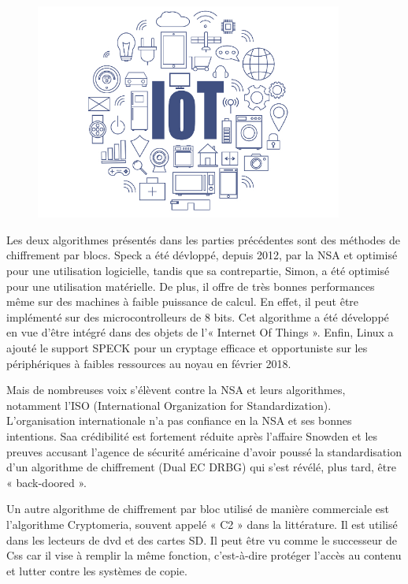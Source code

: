 	\begin{figure}[!h]
		\centering
		\includegraphics[width=0.9\textwidth]{imgs/application/IOT.jpg}
		\label{IOT}
	\end{figure}

	Les deux algorithmes présentés dans les parties précédentes sont des méthodes
	de chiffrement par blocs. Speck a été dévloppé, depuis 2012, par la NSA et
	optimisé pour une utilisation logicielle, tandis que sa contrepartie, Simon, a
	été optimisé pour une utilisation matérielle. De plus, il offre de très bonnes
	performances même sur des machines à faible puissance de calcul. En effet, il
	peut être implémenté sur des microcontrolleurs de 8 bits. Cet algorithme a été
	développé en vue d'être intégré dans des objets de l'« Internet Of Things ».
	Enfin, Linux a ajouté le support SPECK pour un cryptage efficace et
	opportuniste sur les périphériques à faibles ressources au noyau en février
	2018.

	Mais de nombreuses voix s'élèvent contre la NSA et leurs algorithmes,
	notamment l'ISO (International Organization for Standardization).
	L'organisation internationale n'a pas confiance en la NSA et ses bonnes
	intentions. Saa crédibilité est fortement réduite après l'affaire Snowden et
	les preuves accusant l'agence de sécurité américaine d'avoir poussé la
	standardisation d'un algorithme de chiffrement (Dual EC DRBG) qui s'est
	révélé, plus tard, être « back-doored »\cite{NSABackdoor}.

	Un autre algorithme de chiffrement par bloc utilisé de manière commerciale est
	l'algorithme Cryptomeria, souvent appelé « C2 » dans la littérature. Il est
	utilisé dans les lecteurs de dvd et des cartes SD. Il peut être vu comme le
	successeur de Css car il vise à remplir la même fonction, c'est-à-dire
	protéger l'accès au contenu et lutter contre les systèmes de copie.
